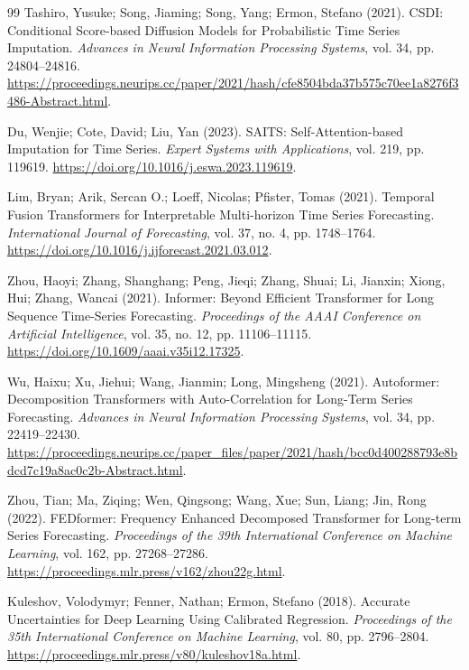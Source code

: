 \begin{thebibliography}{99}
 Tashiro, Yusuke; Song, Jiaming; Song, Yang; Ermon, Stefano (2021). {CSDI}: Conditional Score-based Diffusion Models for Probabilistic Time Series Imputation. \emph{Advances in Neural Information Processing Systems}, vol. 34, pp. 24804--24816. \url{https://proceedings.neurips.cc/paper/2021/hash/cfe8504bda37b575c70ee1a8276f3486-Abstract.html}.

 Du, Wenjie; Cote, David; Liu, Yan (2023). {SAITS}: Self-Attention-based Imputation for Time Series. \emph{Expert Systems with Applications}, vol. 219, pp. 119619. \url{https://doi.org/10.1016/j.eswa.2023.119619}.

 Lim, Bryan; Arik, Sercan O.; Loeff, Nicolas; Pfister, Tomas (2021). Temporal Fusion Transformers for Interpretable Multi-horizon Time Series Forecasting. \emph{International Journal of Forecasting}, vol. 37, no. 4, pp. 1748--1764. \url{https://doi.org/10.1016/j.ijforecast.2021.03.012}.

 Zhou, Haoyi; Zhang, Shanghang; Peng, Jieqi; Zhang, Shuai; Li, Jianxin; Xiong, Hui; Zhang, Wancai (2021). Informer: Beyond Efficient Transformer for Long Sequence Time-Series Forecasting. \emph{Proceedings of the AAAI Conference on Artificial Intelligence}, vol. 35, no. 12, pp. 11106--11115. \url{https://doi.org/10.1609/aaai.v35i12.17325}.

 Wu, Haixu; Xu, Jiehui; Wang, Jianmin; Long, Mingsheng (2021). Autoformer: Decomposition Transformers with Auto-Correlation for Long-Term Series Forecasting. \emph{Advances in Neural Information Processing Systems}, vol. 34, pp. 22419--22430. \url{https://proceedings.neurips.cc/paper_files/paper/2021/hash/bcc0d400288793e8bdcd7c19a8ac0c2b-Abstract.html}.

 Zhou, Tian; Ma, Ziqing; Wen, Qingsong; Wang, Xue; Sun, Liang; Jin, Rong (2022). {FEDformer}: Frequency Enhanced Decomposed Transformer for Long-term Series Forecasting. \emph{Proceedings of the 39th International Conference on Machine Learning}, vol. 162, pp. 27268--27286. \url{https://proceedings.mlr.press/v162/zhou22g.html}.

 Kuleshov, Volodymyr; Fenner, Nathan; Ermon, Stefano (2018). Accurate Uncertainties for Deep Learning Using Calibrated Regression. \emph{Proceedings of the 35th International Conference on Machine Learning}, vol. 80, pp. 2796--2804. \url{https://proceedings.mlr.press/v80/kuleshov18a.html}.


\end{thebibliography}
